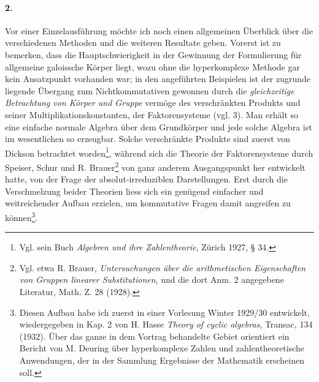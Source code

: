 \paragraph{2.}
Vor einer Einzelausführung möchte ich noch einen allgemeinen Überblick über die verschiedenen Methoden und die weiteren Resultate geben. Vorerst ist zu bemerken, dass die Hauptschwierigkeit in der Gewinnung der Formulierung für allgemeine galoissche Körper liegt, wozu ohne die hyperkomplexe Methode gar kein Ansatzpunkt vorhanden war; in den angeführten Beispielen ist der zugrunde liegende Übergang zum Nichtkommutativen gewonnen durch die \emph{gleichzeitige Betrachtung von Körper und Gruppe} vermöge des \glqq{}verschränkten Produkts\grqq{} und seiner Multiplikationskonstanten, der \glqq{}Faktorensysteme\grqq{} (vgl. 3). Man erhält so eine einfache normale Algebra über dem Grundkörper und jede solche Algebra ist im wesentlichen so erzeugbar. Solche verschränkte Produkte sind zuerst von Dickson betrachtet worden\footnote{Vgl. sein Buch \emph{Algebren und ihre Zahlentheorie}, Zürich 1927, § 34.}, während sich die Theorie der Faktorensysteme durch Speiser, Schur und R. Brauer\footnote{Vgl. etwa R. Brauer, \emph{Untersuchungen über die arithmetischen Eigenschaften von Gruppen linearer Substitutionen}, und die dort Anm. 2 angegebene Literatur, Math. Z. 28 (1928).} von ganz anderem Ausgangspunkt her entwickelt hatte, von der Frage der absolut-irreduziblen Darstellungen. Erst durch die Verschmelzung beider Theorien liess sich ein genügend einfacher und weitreichender Aufbau erzielen, um kommutative Fragen damit angreifen zu können\footnote{Diesen Aufbau habe ich zuerst in einer Vorlesung Winter 1929/30 entwickelt, wiedergegeben in Kap. 2 von H. Hasse \emph{Theory of cyclic algebras}, Transac, 134 (1932). Über das ganze in dem Vortrag behandelte Gebiet orientiert ein Bericht von M. Deuring über hyperkomplexe Zahlen und zahlentheoretische Anwendungen, der in der Sammlung \glqq{}Ergebnisse der Mathematik\grqq{} erscheinen soll.}.

